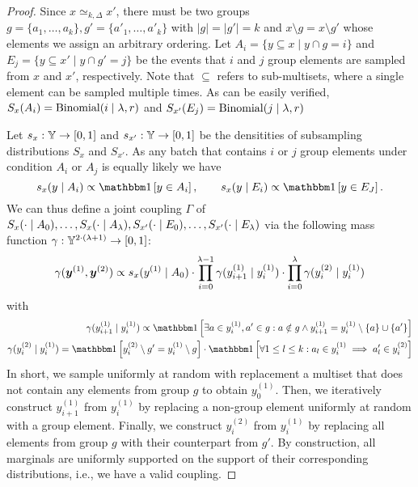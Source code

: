 \begin{proof}
    Since $x \simeq_{k,\Delta} x'$, there must be two groups $g = \{a_1,\dots,a_k\},
    g' = \{a'_1,\dots,a'_k\}$ with $|g| = |g'| = k$ 
    and $x \setminus g = x \setminus g'$ whose elements we assign an arbitrary ordering. 
    Let $A_i = \{y \subseteq x \mid y \cap g = i\}$
    and $E_j = \{y \subseteq x' \mid y \cap g' = j\}$
    be the events that $i$ and $j$ group elements are sampled from $x$ and $x'$, respectively. Note that $\subseteq$ refers to sub-multisets, where a single element can be sampled multiple times.
    As can be easily verified, $S_x(A_i) = \mathrm{Binomial}(i \mid \lambda, r)$ and $S_{x'}(E_j) = \mathrm{Binomial}(j \mid \lambda, r)$
    
    Let $s_x : {\mathbb{Y}} \rightarrow [0,1] $ and $s_{x'} : {\mathbb{Y}} \rightarrow [0,1]$ be the densitities of subsampling distributions $S_x$ and $S_{x'}$. As any batch that contains $i$ or $j$ group elements under condition $A_i$ or $A_j$ is equally likely we have 
    \begin{equation*}
        s_x(y \mid A_i) \propto \indicator\left[y \in A_i\right],  \qquad s_x(y \mid E_i) \propto \indicator\left[y \in E_J\right].
    \end{equation*}
    We can thus define a joint coupling $\Gamma$ of $S_x(\cdot \mid A_0),\dots,S_x(\cdot \mid A_\lambda), S_{x'}(\cdot \mid E_0),\dots,S_{x'}(\cdot \mid E_\lambda)$
    via the following mass function $\gamma : {\mathbb{Y}}^{2 \cdot (\lambda + 1)}  \rightarrow [0,1]$:
    \begin{align*}
        \gamma({\bm{y}}^{(1)}, {\bm{y}}^{(2)})
        \propto
        s_x(y^{(1)} \mid A_0)
        \cdot
        \prod_{i=0}^{\lambda - 1}
        \gamma(y^{(1)}_{i+1} \mid y^{(1)}_{i})
        \cdot
        \prod_{i=0}^{\lambda}
        \gamma(y^{(2)}_{i} \mid y^{(1)}_{i})
    \end{align*}
    with
    \begin{align*}
        \gamma(y^{(1)}_{i+1} \mid y^{(1)}_{i})
        \propto
        \indicator \left[
            \exists a \in y^{(1)}_{i}, a' \in g :
            a \notin g \land y^{(1)}_{i+1} = y^{(1)}_{i} \setminus \{a\} \cup \{a'\}
        \right]
        \\
        \gamma(y^{(2)}_{i} \mid y^{(1)}_{i})
        =
        \indicator \left[
            y^{(2)}_{i} \setminus g' =  y^{(1)}_{i} \setminus g
        \right]
        \cdot 
        \indicator \left[
            \forall 1 \leq l \leq k:
            a_l \in y^{(1)}_{i} \implies a'_l \in y^{(2)}_{i}
        \right]
    \end{align*}
    In short, we sample uniformly at random with replacement a multiset that does not contain any elements from group $g$ to obtain $y^{(1)}_0$.
    Then, we iteratively construct $y^{(1)}_{i+1}$ from $y^{(1)}_{i}$ by replacing a non-group element uniformly at random with a group element.
    Finally, we construct $y^{(2)}_{i}$ from $y^{(1)}_{i}$ by replacing all elements from group $g$ with their counterpart from $g'$.
    By construction, all marginals are uniformly supported on the support of their corresponding distributions, i.e., we have a valid coupling.


\end{proof}

